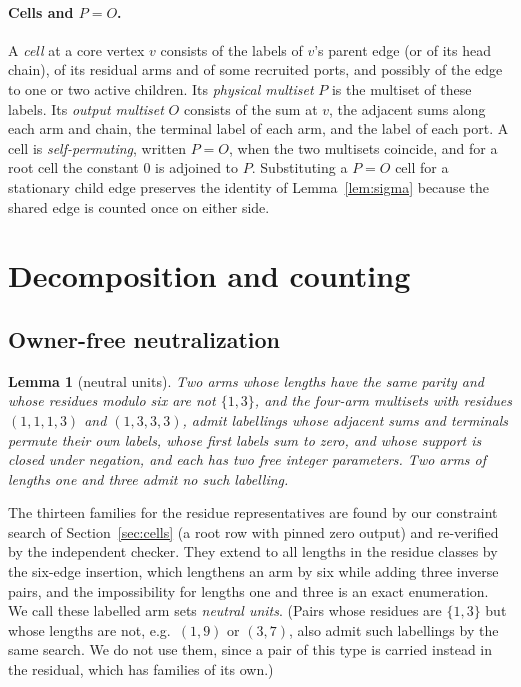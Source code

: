 \documentclass[11pt,a4paper]{article}
\theoremstyle{plain}
\newtheorem{lemma}[theorem]{Lemma}
\theoremstyle{definition}
\theoremstyle{remark}
\newcommand{\PO}{P\!=\!O}
\begin{document}
\paragraph{Cells and $\PO$.}
A \emph{cell} at a core vertex $v$ consists of the labels of $v$'s parent edge
(or of its head chain), of its residual arms and of some recruited ports, and
possibly of the edge to one or two active children.  Its \emph{physical
multiset} $P$ is the multiset of these labels.  Its \emph{output multiset} $O$
consists of the sum at $v$, the adjacent sums along each arm and chain, the
terminal label of each arm, and the label of each port.  A cell is
\emph{self-permuting}, written $\PO$, when the two multisets coincide, and
for a root cell the constant $0$ is adjoined to $P$.  Substituting a $\PO$ cell for
a stationary child edge preserves the identity of Lemma~\ref{lem:sigma}
because the shared edge is counted once on either side.

\section{Decomposition and counting}\label{sec:decomp}

\subsection{Owner-free neutralization}

\begin{lemma}[neutral units]\label{lem:units}
Two arms whose lengths have the same parity and whose residues modulo six are
not $\{1,3\}$, and the four-arm multisets with residues $(1,1,1,3)$ and
$(1,3,3,3)$, admit labellings whose adjacent sums and terminals permute their
own labels, whose first labels sum to zero, and whose support is closed under
negation, and each has two free integer parameters.  Two arms of lengths one and
three admit no such labelling.
\end{lemma}

The thirteen families for the residue representatives are found by our
constraint search of Section~\ref{sec:cells} (a root row with pinned zero
output) and re-verified by the independent checker.  They extend to all
lengths in the residue classes by the six-edge insertion, which lengthens an
arm by six while adding three inverse pairs, and the impossibility for lengths
one and three is an exact enumeration.  We call these labelled arm sets
\emph{neutral units}.  (Pairs whose residues are $\{1,3\}$ but whose lengths
are not, e.g.\ $(1,9)$ or $(3,7)$, also admit such labellings by the same
search.  We do not use them, since a pair of this type is carried instead in
the residual, which has families of its own.)
\end{document}
